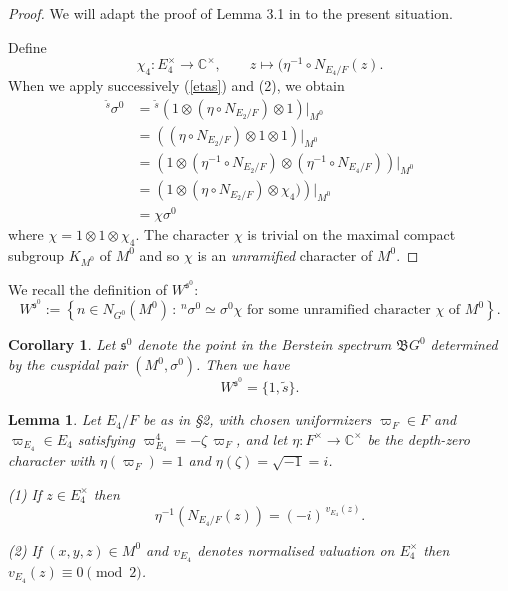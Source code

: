 \documentclass[11pt]{amsart}
\newtheorem{lemma}[theorem]{Lemma}
\newtheorem{corollary}[theorem]{Corollary}
\theoremstyle{remark}
\theoremstyle{definition}
\newcommand{\C}{\mathbb{C}}
\newcommand{\fs}{\mathfrak{s}}
\begin{document}
\begin{proof}   We will adapt the proof of Lemma 3.1 in \cite{AFO} to the present situation. 


Define
\[
\chi_4 \colon E_4^\times \to \C^\times, \qquad z \mapsto (\eta^{-1} \circ N_{E_4/F}(z).
\]
When we apply successively (\ref{etas}) and (2), we obtain
\begin{align*}
{}^{\widetilde{s}} \sigma^0 & = {}^{\widetilde{s}}(1 \otimes (\eta \circ N_{E_2/F}) \otimes 1)|_{M^0}\\
& = \left((\eta \circ N_{E_2/F}) \otimes 1 \otimes 1\right)|_{M^0}\\
& = \left(1 \otimes (\eta^{-1} \circ N_{E_2/F})  \otimes (\eta^{-1} \circ N_{E_4/F}) \right)|_{M^0}\\
& = \left(1 \otimes (\eta \circ N_{E_2/F})  \otimes \chi_4) \right)|_{M^0}\\
& = \chi \sigma^0
\end{align*}
where $\chi = 1 \otimes 1 \otimes \chi_4$.  The character $\chi$ is trivial on the maximal compact subgroup $K_{M^0}$ of $M^0$ and so $\chi$ is an \emph{unramified} character of $M^0$. 
\end{proof}  

We recall the definition of $W^{\fs^0}$:
\[W^{\fs^0}:=\left\{n\in N_{G^0}(M^0)\,: \,{}^n\sigma^0\simeq \sigma^0\chi \text{ for some unramified character $\chi$ of $M^0$}\right\}.\]

\begin{corollary}   Let $\fs^0$ denote the point in the Berstein spectrum $\mathfrak{B}G^0$ determined by the  cuspidal pair $(M^0, \sigma^0)$.     Then we have
\[
W^{\fs^0} = \{1, \widetilde{s}\}.
\]
\end{corollary}





\begin{lemma}\label{normE4}
Let $E_4/F$ be as in \S2, with chosen uniformizers $\varpi_F\in F$ and
$\varpi_{E_4}\in E_4$ satisfying $\varpi_{E_4}^4=-\zeta\,\varpi_F$, and let
$\eta:F^\times\to\C^\times$ be the depth-zero character with $\eta(\varpi_F)=1$
and $\eta(\zeta)=\sqrt{-1}=i$.

(1) If $z \in E_4^\times$ then
\[
\eta^{-1}\!\left(N_{E_4/F}(z)\right)=(-i)^{\,v_{E_4}(z)}.
\]

(2) If $(x,y,z) \in M^0$ and $v_{E_4}$ denotes normalised valuation on $E_4^\times$ then $v_{E_4}(z) \equiv  0 \pmod 2$.   
\end{lemma}
\end{document}
